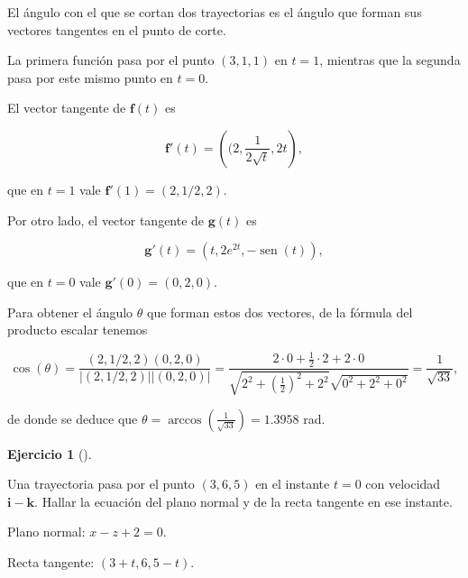 \documentclass[
  a4paper,
]{scrreport}
\theoremstyle{definition}
\newtheorem{exercise}{Ejercicio}[chapter]
\theoremstyle{remark}
\begin{document}
\begin{tcolorbox}[enhanced jigsaw, left=2mm, coltitle=black, colbacktitle=quarto-callout-tip-color!10!white, opacitybacktitle=0.6, colback=white, breakable, titlerule=0mm, toptitle=1mm, rightrule=.15mm, bottomtitle=1mm, bottomrule=.15mm, toprule=.15mm, leftrule=.75mm, arc=.35mm, opacityback=0, title=\textcolor{quarto-callout-tip-color}{\faLightbulb}\hspace{0.5em}{Solución}, colframe=quarto-callout-tip-color-frame]

El ángulo con el que se cortan dos trayectorias es el ángulo que forman
sus vectores tangentes en el punto de corte.

La primera función pasa por el punto \((3,1,1)\) en \(t=1\), mientras
que la segunda pasa por este mismo punto en \(t=0\).

El vector tangente de \(\mathbf{f}(t)\) es

\[
\mathbf{f}'(t) = \left((2, \frac{1}{2\sqrt{t}}, 2t\right),
\]

que en \(t=1\) vale \(\mathbf{f}'(1) = (2,1/2,2)\).

Por otro lado, el vector tangente de \(\mathbf{g}(t)\) es

\[
\mathbf{g}'(t) = (t, 2e^{2t}, -\operatorname{sen}(t)),
\]

que en \(t=0\) vale \(\mathbf{g}'(0) = (0,2,0)\).

Para obtener el ángulo \(\theta\) que forman estos dos vectores, de la
fórmula del producto escalar tenemos

\[
\cos(\theta) 
= \frac{(2,1/2,2)(0,2,0)}{|(2,1/2,2)||(0,2,0)|}
= \frac{2\cdot 0+\frac{1}{2}\cdot 2+2\cdot 0}{\sqrt{2^2+\left(\frac{1}{2}\right)^2+2^2}\sqrt{0^2+2^2+0^2}}
= \frac{1}{\sqrt{33}},
\]

de donde se deduce que
\(\theta = \operatorname{arccos}(\frac{1}{\sqrt{33}}) = 1.3958\) rad.

\end{tcolorbox}

\begin{exercise}[]\protect\hypertarget{exr-plano-normal-trayectoria}{}\label{exr-plano-normal-trayectoria}

Una trayectoria pasa por el punto \((3,6,5)\) en el instante \(t=0\) con
velocidad \(\mathbf{i}-\mathbf{k}\). Hallar la ecuación del plano normal
y de la recta tangente en ese instante.

\end{exercise}

\begin{tcolorbox}[enhanced jigsaw, left=2mm, coltitle=black, colbacktitle=quarto-callout-tip-color!10!white, opacitybacktitle=0.6, colback=white, breakable, titlerule=0mm, toptitle=1mm, rightrule=.15mm, bottomtitle=1mm, bottomrule=.15mm, toprule=.15mm, leftrule=.75mm, arc=.35mm, opacityback=0, title=\textcolor{quarto-callout-tip-color}{\faLightbulb}\hspace{0.5em}{Solución}, colframe=quarto-callout-tip-color-frame]

Plano normal: \(x-z+2=0\).

Recta tangente: \((3+t,6,5-t)\).

\end{tcolorbox}
\end{document}
